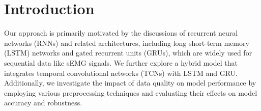 
\section{Introduction}
Our approach is primarily motivated by the discussions of recurrent neural networks (RNNs) and related architectures, 
including long short-term memory (LSTM) networks and gated recurrent units (GRUs), 
which are widely used for sequential data like sEMG signals. 
We further explore a hybrid model that integrates temporal convolutional networks (TCNs) with LSTM and GRU. 
Additionally, we investigate the impact of data quality on model performance by employing various preprocessing techniques 
and evaluating their effects on model accuracy and robustness.



